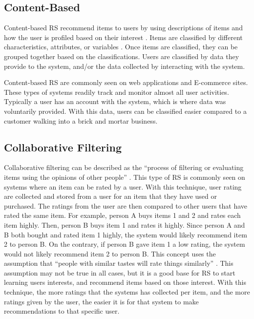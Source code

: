 \documentclass[sigconf]{acmart}
\begin{document}
\subsection{Content-Based}
Content-based RS recommend items to users by using descriptions of items and how the user is profiled based on
their interest \cite {Pazzani2007}. Items are classified by different characteristics, attributes, or variables
\cite{Pazzani2007}. Once items are classified, they can be grouped together based on the classifications. Users
are classified by data they provide to the system, and/or the data collected by interacting with the system. 

Content-based RS are commonly seen on web applications and E-commerce sites. These types of systems readily
track and monitor almost all user activities. Typically a user has an account with the system, which is where
data was voluntarily provided. With this data, users can be classified easier compared to a customer walking
into a brick and mortar business. 

\subsection{Collaborative Filtering}
Collaborative filtering can be described as the ``process of filtering or evaluating items using the opinions of other people''
\cite{Schafer2007}. This type of RS is commonly seen on systems where an item can be rated by a user. With this
technique, user rating are collected and stored from a user for an item that they have used or purchased. The
ratings from the user are then compared to other users that have rated the same item. For example, person A
buys items 1 and 2 and rates each item highly. Then, person B buys item 1 and rates it highly. Since person A
and B both bought and rated item 1 highly, the system would likely recommend item 2 to person B. On the
contrary, if person B gave item 1 a low rating, the system would not likely recommend item 2 to person B. This
concept uses the assumption that ``people with similar tastes will rate things similarly'' \cite{Schafer2007}. 
This assumption may not be true in all cases, but it is a good base for RS to start learning users interests, 
and recommend items based on those interest. With this technique, the more ratings that the systems has
collected per item, and the more ratings given by the user, the easier it is for that system to make
recommendations to that specific user. 
\end{document}
